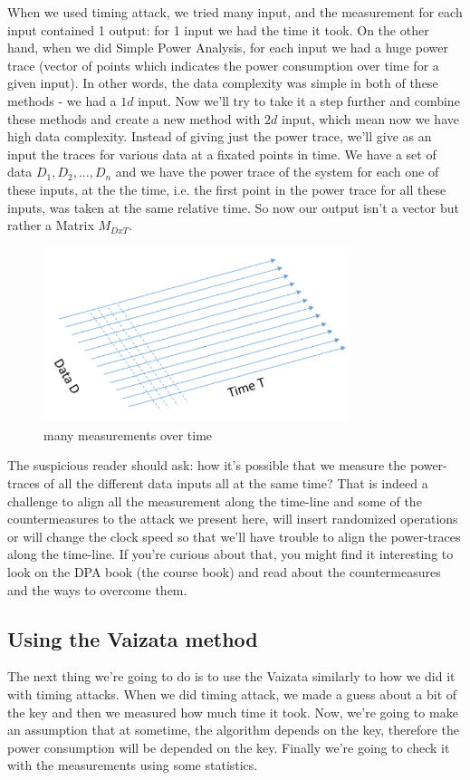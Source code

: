 When we used timing attack, we tried many input, and the measurement for each
input contained 1 output: for 1 input we had the time it took. On the other
hand, when we did Simple Power Analysis, for each input we had a huge power
trace (vector of points which indicates the power consumption over time for a
given input). In other words, the data complexity was simple in both of these
methods - we had a $1d$ input. Now we'll try to take it a step further and
combine these methods and create a new method with $2d$ input, which mean now we
have high data complexity. Instead of giving just the power trace, we'll give as
an input the traces for various data at a fixated points in time. We have a set
of data ${D_1, D_2, ..., D_n}$ and we have the power trace of the system for
each one of these inputs, at the the time, i.e. the first point in the power
trace for all these inputs, was taken at the same relative time. So now our
output isn't a vector but rather a Matrix $M_{DxT}$.

\begin{figure}[!ht]
    \centering
    \includegraphics[width=0.8\textwidth]{images/Lecture6/DPA_Illustration.png}
    \caption{many measurements over time} \label{fig:DPA_Illustration}
\end{figure}

The suspicious reader should ask: how it's possible that we measure the
power-traces of all the different data inputs all at the same time? That is
indeed a challenge to align all the measurement along the time-line and some of
the countermeasures to the attack we present here, will insert randomized
operations or will change the clock speed so that we'll have trouble to align
the power-traces along the time-line. If you're curious about that, you might
find it interesting to look on the DPA book (the course book) and read about the
countermeasures and the ways to overcome them.

\subsection{Using the Vaizata method}
The next thing we're going to do is to use the Vaizata similarly to how we did
it with timing attacks. When we did timing attack, we made a guess about a bit
of the key and then we measured how much time it took. Now, we're going to make
an assumption that at sometime, the algorithm depends on the key, therefore the
power consumption will be depended on the key. Finally we're going to check it
with the measurements using some statistics. 

